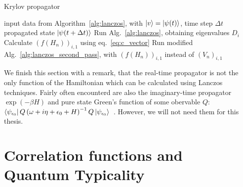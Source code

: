 \begin{algorithm}
	\algrenewcommand{}
	\algrenewcommand{}
	\caption{Krylov propagator}
	\label{alg:krylov_propagator}
	\begin{algorithmic}[1]
	\Require input data from Algorithm~\ref{alg:lanczos}, with \(\ket{v} = \ket{\psi(t)}\), time step \(\Delta t\)
	\Ensure propagated state \(\ket{\psi(t+\Delta t)}\)
		\State Run Alg.~\ref{alg:lanczos}, obtaining eigenvalues \(D_i\)
		\State Calculate \(\left(f(H_n)\right)_{i,1}\) using eq.~\eqref{eq:c_vector}
		\State Run modified Alg.~\ref{alg:lanczos_second_pass}, with \(\left(f(H_n)\right)_{i,1}\) instead of \(\left(V_n\right)_{i,1}\)
	\end{algorithmic}
\end{algorithm}

We finish this section with a remark, that the real-time propagator is not the only function of the Hamiltonian which can
be calculated using Lanczos techniques. Fairly often encounterd are also the imaginary-time propagator \(\exp\left(-\beta H\right)\)
and pure state Green's function of some obervable \(Q\): \(\bra{\psi_{\epsilon_0}} Q \left(\omega + i\eta +\epsilon_0  
+ H \right)^{-1} Q \ket{\psi_{\epsilon_0}}\)~\autocite{Dagotto1994}. However, we will not need them for this thesis.


\section{Correlation functions and Quantum Typicality}

